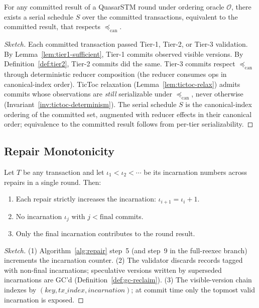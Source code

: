 \begin{theorem}
\label{thm:serializable}
For any committed result of a QuasarSTM round under ordering oracle
$\mathcal{O}$, there exists a serial schedule $S$ over the committed
transactions, equivalent to the committed result, that respects
$\preceq_{\mathrm{can}}$.
\end{theorem}

\begin{proof}[Sketch]
Each committed transaction passed Tier-1, Tier-2, or Tier-3
validation. By Lemma~\ref{lem:tier1-sufficient}, Tier-1 commits
observed visible versions. By Definition~\ref{def:tier2}, Tier-2
commits did the same. Tier-3 commits respect $\preceq_{\mathrm{can}}$
through deterministic reducer composition (the reducer consumes ops
in canonical-index order).
TicToc relaxation
(Lemma~\ref{lem:tictoc-relax}) admits commits whose observations are
\emph{still} serializable under $\preceq_{\mathrm{can}}$, never
otherwise (Invariant~\ref{inv:tictoc-determinism}). The serial
schedule $S$ is the canonical-index ordering of the committed set,
augmented with reducer effects in their canonical order; equivalence
to the committed result follows from per-tier serializability.
\end{proof}

\subsection{Repair Monotonicity}

\begin{theorem}
\label{thm:repair-monotone}
Let $T$ be any transaction and let $\iota_1 < \iota_2 < \cdots$ be
its incarnation numbers across repairs in a single round. Then:
\begin{enumerate}[leftmargin=2em,nosep]
\item Each repair strictly increases the incarnation:
      $\iota_{i+1} = \iota_i + 1$.
\item No incarnation $\iota_j$ with $j < \mathrm{final}$ commits.
\item Only the final incarnation contributes to the round result.
\end{enumerate}
\end{theorem}

\begin{proof}[Sketch]
(1) Algorithm~\ref{alg:repair} step~5 (and step~9 in the full-reexec
branch) increments the incarnation counter. (2) The validator
discards records tagged with non-final incarnations; speculative
versions written by superseded incarnations are GC'd
(Definition~\ref{def:gc-reclaim}). (3) The visible-version chain
indexes by $(\mathit{key}, \mathit{tx\_index},
\mathit{incarnation})$; at commit time only the topmost valid
incarnation is exposed.
\end{proof}

